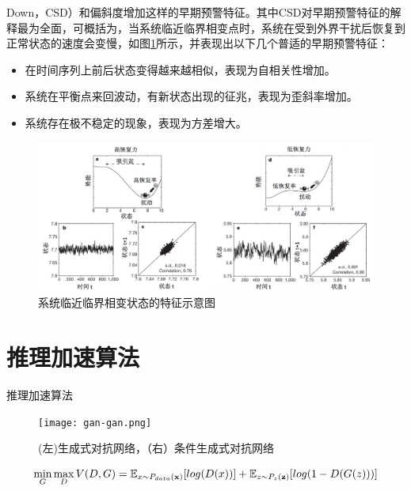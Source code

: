  Down，CSD）\cite{scheffer2009early,dakos2008slowing}和偏斜度增加\cite{guttal2008changing}这样的早期预警特征。其中CSD对早期预警特征的解释最为全面，可概括为，当系统临近临界相变点时，系统在受到外界干扰后恢复到正常状态的速度会变慢，如图\ref{fig:csd-early-warning-signal}所示，并表现出以下几个普适的早期预警特征：
\begin{itemize}
  \item 在时间序列上前后状态变得越来越相似，表现为自相关性增加。
  \item 系统在平衡点来回波动，有新状态出现的征兆，表现为歪斜率增加。
  \item 系统存在极不稳定的现象，表现为方差增大。
\end{itemize}
\begin{figure}[H]
\centering
\includegraphics[scale=0.5]{figures/csd-early-warning-signal.png}
\caption{系统临近临界相变状态的特征示意图\cite{scheffer2009early}}
\label{fig:csd-early-warning-signal}
\end{figure}


\section{推理加速算法}
\label{sec:gan-review}
推理加速算法


\begin{figure}[H]
\centering
\texttt{[image: gan-gan.png]}
\caption{(左)生成式对抗网络，（右）条件生成式对抗网络}
\label{fig:gan-gan}
\end{figure}

\begin{equation}
\label{eq:gan-objective-function}
  \min_{G}\max_{D} V(D,G) = \mathbb{E}_{x \sim P_{data}(\bf{x})}[log(D(x))] + \mathbb{E}_{z \sim P_{z}(\bf{z})}[log(1-D(G(z)))]
\end{equation}

